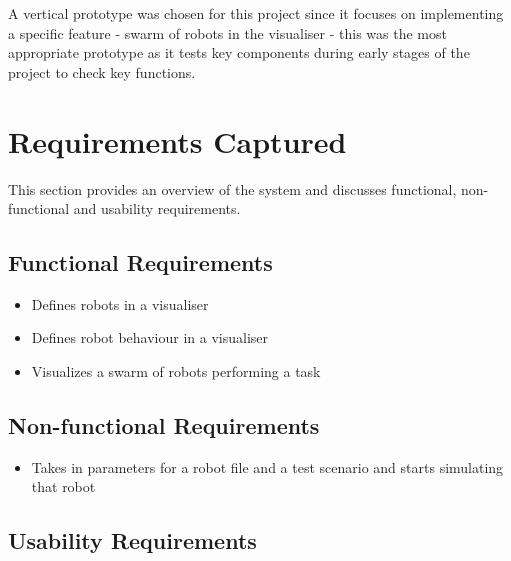 \documentclass[11pt,a4paper]{article}
\begin{document}
A vertical prototype was chosen for this project since it focuses on
implementing a specific feature - swarm of robots in the visualiser - this was
the most appropriate prototype as it tests key components during early stages
of the project to check key functions.


\section{Requirements Captured}


This section provides an overview of the system and discusses functional,
non-functional and usability requirements.

\subsection{Functional Requirements}
\begin{itemize}
  \item Defines robots in a visualiser
  \item Defines robot behaviour in a visualiser
  \item Visualizes a swarm of robots performing a task
\end{itemize}

\subsection{Non-functional Requirements}
\begin{itemize}
  \item Takes in parameters for a robot file and a test scenario and starts
      simulating that robot
\end{itemize}

\subsection{Usability Requirements}
\end{document}
